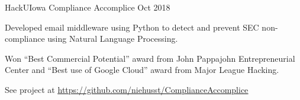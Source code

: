 \documentclass[12pt, a4paper]{awesome-cv}
\begin{document}


\begin{cventries}

    \cventry
	{HackUIowa}
 	{Compliance Accomplice}
	{Oct 2018}
	{}
	{
	  \begin{cvitems}
	     \item{Developed email middleware using Python to detect and prevent SEC non-compliance using Natural Language Processing.}
	     \item{Won “Best Commercial Potential” award from John Pappajohn Entrepreneurial Center and “Best use of Google Cloud” award from Major League Hacking.}
	     \item{See project at \underline{\href{https://github.com/niehusst/ComplianceAccomplice}{https://github.com/niehusst/ComplianceAccomplice}}} 
	  \end{cvitems}
	}
\end{cventries}
\end{document}
